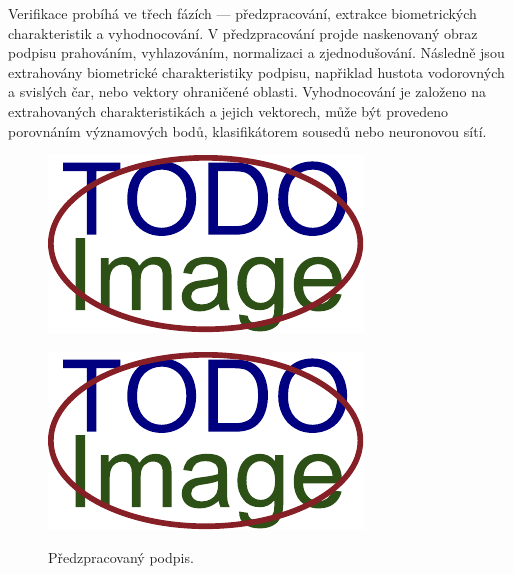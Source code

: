 Verifikace probíhá ve třech fázích --- předzpracování, extrakce biometrických charakteristik a vyhodnocování. %
V předzpracování projde naskenovaný obraz podpisu prahováním, vyhlazováním, normalizaci a zjednodušování.     %
Následně jsou extrahovány biometrické charakteristiky podpisu,                                                %
napřiklad hustota vodorovných a svislých čar, nebo vektory ohraničené oblasti.                                %
Vyhodnocování je založeno na extrahovaných charakteristikách a jejich vektorech,                              %
může být provedeno porovnáním významových bodů, klasifikátorem sousedů nebo neuronovou sítí.                  %

\begin{figure}[h]
  \centering
  \begin{minipage}{0.3\textwidth}\label{fig:first-image}
    \centering
    \includegraphics[width=\textwidth]{obrazky-figures/placeholder.pdf}
    \caption{Předzpracovaný podpis.}
  \end{minipage}\hfill
  \begin{minipage}{0.3\textwidth}\label{fig:second-image}
    \centering
    \includegraphics[width=\textwidth]{obrazky-figures/placeholder.pdf}

\end{minipage}
\end{figure}
